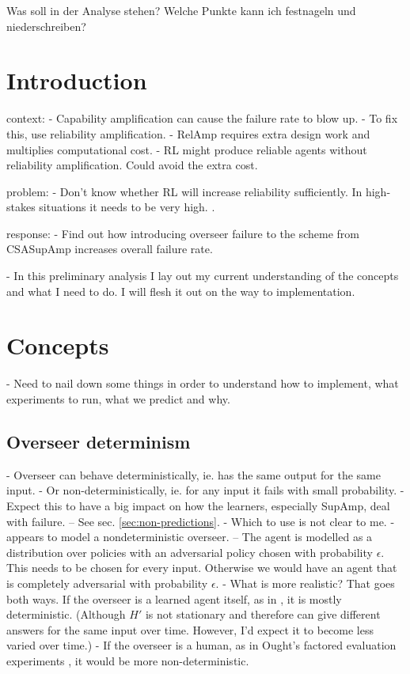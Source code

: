 Was soll in der Analyse stehen? Welche Punkte kann ich festnageln und
niederschreiben?

\section{Introduction}

context:
- Capability amplification can cause the failure rate to blow up.
- To fix this, use reliability amplification.
- RelAmp requires extra design work and multiplies computational cost.
- RL might produce reliable agents without reliability amplification. Could
avoid the extra cost.

problem:
- Don't know whether RL will increase reliability sufficiently. In high-stakes
situations it needs to be very high. \cite[Cf.][]{ChriLearnCata}.

response:
- Find out how introducing overseer failure to the scheme from CSASupAmp
increases overall failure rate.

- In this preliminary analysis I lay out my current understanding of the
concepts and what I need to do. I will flesh it out on the way to
implementation.


\section{Concepts}

- Need to nail down some things in order to understand how to implement, what
experiments to run, what we predict and why.


\subsection{Overseer determinism}

- Overseer can behave deterministically, ie. has the same output for the same
input.
- Or non-deterministically, ie. for any input it fails with small probability.
- Expect this to have a big impact on how the learners, especially SupAmp, deal
with failure. – See sec. \ref{sec:non-predictions}.
- \OQ Which to use is not clear to me.
    - \textcite{ChriRelAmp} appears to model a nondeterministic overseer. – The
    agent is modelled as a distribution over policies with an adversarial policy
    chosen with probability $\epsilon$. This needs to be chosen for every input.
    Otherwise we would have an agent that is completely adversarial with
    probability $\epsilon$.
    - What is more realistic? That goes both ways. If the overseer is a learned
    agent itself, as in \textcite{CSASupAmp}, it is mostly deterministic.
    (Although $H'$ is not stationary and therefore can give different answers
    for the same input over time. However, I'd expect it to become less varied
    over time.)
    - If the overseer is a human, as in Ought's factored evaluation experiments
    \parencite{StuhDelCog}, it would be more non-deterministic.


